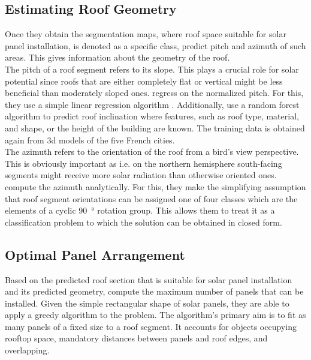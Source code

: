 \documentclass{article} %
\begin{document}
\subsection*{Estimating Roof Geometry}
Once they obtain the segmentation maps, where roof space suitable for solar panel installation, is denoted as a specific class, \citet{de2021predicting} predict pitch and azimuth of such areas. This gives information about the geometry of the roof.\\
The pitch of a roof segment refers to its slope. This plays a crucial role for solar potential since roofs that are either completely flat or vertical might be less beneficial than moderately sloped ones. \citet{de2021predicting} regress on the normalized pitch. For this, they use a simple linear regression algorithm \cite{gross2003linear}. Additionally,\citet{de2021predicting} use a random forest algorithm \cite{belgiu2016random} to predict roof inclination where features, such as roof type, material, and shape, or the height of the building are known. The training data is obtained again from 3d models of the five French cities.\\
The azimuth refers to the orientation of the roof from a bird's view perspective. This is obviously important as i.e. on the northern hemisphere south-facing segments might receive more solar radiation than otherwise oriented ones.\\ \citet{de2021predicting} compute the azimuth analytically. For this, they make the simplifying assumption that roof segment orientations can be assigned one of four classes which are the elements of a cyclic \SI{90}{\degree} rotation group. This allows them to treat it as a classification problem to which the solution can be obtained in closed form.

\subsection*{Optimal Panel Arrangement}
Based on the predicted roof section that is suitable for solar panel installation and its predicted geometry, \citet{de2021predicting} compute the maximum number of panels that can be installed. Given the simple rectangular shape of solar panels, they are able to apply a greedy algorithm to the problem. The algorithm's primary aim is to fit as many panels of a fixed size to a roof segment. It accounts for objects occupying rooftop space, mandatory distances between panels and roof edges, and overlapping.
\end{document}
